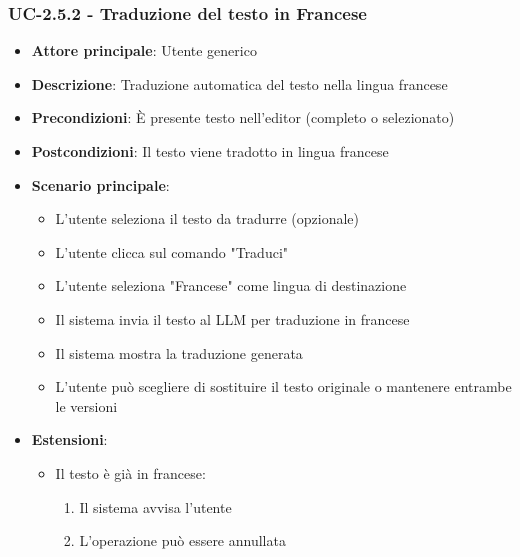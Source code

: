 \documentclass[11pt,a4paper]{article}
\begin{document}
\subsubsection{UC-2.5.2 - Traduzione del testo in Francese}
\begin{itemize}
    \item \textbf{Attore principale}: Utente generico
    \item \textbf{Descrizione}: Traduzione automatica del testo nella lingua francese
    \item \textbf{Precondizioni}: È presente testo nell'editor (completo o selezionato)
    \item \textbf{Postcondizioni}: Il testo viene tradotto in lingua francese
    \item \textbf{Scenario principale}:
        \begin{itemize}
            \item L'utente seleziona il testo da tradurre (opzionale)
            \item L'utente clicca sul comando "Traduci"
            \item L'utente seleziona "Francese" come lingua di destinazione
            \item Il sistema invia il testo al LLM per traduzione in francese
            \item Il sistema mostra la traduzione generata
            \item L'utente può scegliere di sostituire il testo originale o mantenere entrambe le versioni
        \end{itemize}
    \item \textbf{Estensioni}:
        \begin{itemize}
            \item Il testo è già in francese:
                \begin{enumerate}
                    \item Il sistema avvisa l'utente
                    \item L'operazione può essere annullata
                \end{enumerate}
        \end{itemize}
\end{itemize}
\end{document}
